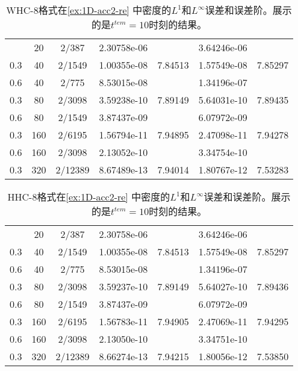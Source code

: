 \begin{table}[htbp]
	\caption{WHC-8格式在\cref{ex:1D-acc2-re} 中密度的$L^1$和$L^\infty$误差和误差阶。展示的是$t^{tem} = 10$时刻的结果。}
	\label{ta:1D-ex2-WHC8}
	\centering
	\begin{tabular}{ccccccc}
		\toprule
		\titleintable
		\midrule
		0.6 & 20  & 2/387   & 2.30758e-06 &         & 3.64246e-06 &         \\
		0.3 & 40  & 2/1549  & 1.00355e-08 & 7.84513 & 1.57549e-08 & 7.85297 \\
		\midrule
		0.6 & 40  & 2/775   & 8.53015e-08 &         & 1.34196e-07 &         \\
		0.3 & 80  & 2/3098  & 3.59238e-10 & 7.89149 & 5.64031e-10 & 7.89435 \\
		\midrule
		0.6 & 80  & 2/1549  & 3.87437e-09 &         & 6.07972e-09 &         \\
		0.3 & 160 & 2/6195  & 1.56794e-11 & 7.94895 & 2.47098e-11 & 7.94278 \\
		\midrule
		0.6 & 160 & 2/3098  & 2.13052e-10 &         & 3.34754e-10 &         \\
		0.3 & 320 & 2/12389 & 8.67489e-13 & 7.94014 & 1.80767e-12 & 7.53283 \\
		\bottomrule
	\end{tabular}
\end{table}

\begin{table}[htbp]
	\caption{HHC-8格式在\cref{ex:1D-acc2-re} 中密度的$L^1$和$L^\infty$误差和误差阶。展示的是$t^{tem} = 10$时刻的结果。}
	\label{ta:1D-ex2-HHC8}
	\centering
	\begin{tabular}{ccccccc}
		\toprule
		\titleintable
		\midrule
		0.6 & 20  & 2/387   & 2.30758e-06 &         & 3.64246e-06 &         \\
		0.3 & 40  & 2/1549  & 1.00355e-08 & 7.84513 & 1.57549e-08 & 7.85297 \\
		\midrule
		0.6 & 40  & 2/775   & 8.53015e-08 &         & 1.34196e-07 &         \\
		0.3 & 80  & 2/3098  & 3.59237e-10 & 7.89149 & 5.64027e-10 & 7.89436 \\
		\midrule
		0.6 & 80  & 2/1549  & 3.87437e-09 &         & 6.07972e-09 &         \\
		0.3 & 160 & 2/6195  & 1.56783e-11 & 7.94905 & 2.47069e-11 & 7.94295 \\
		\midrule
		0.6 & 160 & 2/3098  & 2.13050e-10 &         & 3.34751e-10 &         \\
		0.3 & 320 & 2/12389 & 8.66274e-13 & 7.94215 & 1.80056e-12 & 7.53850 \\
		\bottomrule
	\end{tabular}
\end{table}
\undef\titleintable